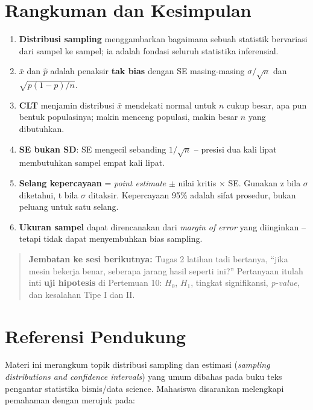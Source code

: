 \documentclass[
  indonesian,
  letterpaper,
]{book}
\begin{document}

\chapter{Rangkuman dan Kesimpulan}\label{rangkuman-dan-kesimpulan}

\begin{enumerate}
\def\labelenumi{\arabic{enumi}.}
\item
  \textbf{Distribusi sampling} menggambarkan bagaimana sebuah statistik
  bervariasi dari sampel ke sampel; ia adalah fondasi seluruh statistika
  inferensial.
\item
  \(\bar{x}\) dan \(\hat{p}\) adalah penaksir \textbf{tak bias} dengan
  SE masing-masing \(\sigma/\sqrt{n}\) dan \(\sqrt{p(1 - p)/n}\).
\item
  \textbf{CLT} menjamin distribusi \(\bar{x}\) mendekati normal untuk
  \(n\) cukup besar, apa pun bentuk populasinya; makin menceng populasi,
  makin besar \(n\) yang dibutuhkan.
\item
  \textbf{SE bukan SD}: SE mengecil sebanding \(1/\sqrt{n}\) -- presisi
  dua kali lipat membutuhkan sampel empat kali lipat.
\item
  \textbf{Selang kepercayaan} = \emph{point estimate} \(\pm\) nilai
  kritis \(\times\) SE. Gunakan z bila \(\sigma\) diketahui, t bila
  \(\sigma\) ditaksir. Kepercayaan 95\% adalah sifat prosedur, bukan
  peluang untuk satu selang.
\item
  \textbf{Ukuran sampel} dapat direncanakan dari \emph{margin of error}
  yang diinginkan -- tetapi tidak dapat menyembuhkan bias sampling.
\end{enumerate}

\begin{quote}
\textbf{Jembatan ke sesi berikutnya:} Tugas 2 latihan tadi bertanya,
``jika mesin bekerja benar, seberapa jarang hasil seperti ini?''
Pertanyaan itulah inti \textbf{uji hipotesis} di Pertemuan 10: \(H_0\),
\(H_1\), tingkat signifikansi, \emph{p-value}, dan kesalahan Tipe I dan
II.
\end{quote}


\chapter{Referensi Pendukung}\label{referensi-pendukung}

Materi ini merangkum topik distribusi sampling dan estimasi
(\emph{sampling distributions and confidence intervals}) yang umum
dibahas pada buku teks pengantar statistika bisnis/data science.
Mahasiswa disarankan melengkapi pemahaman dengan merujuk pada:
\end{document}
